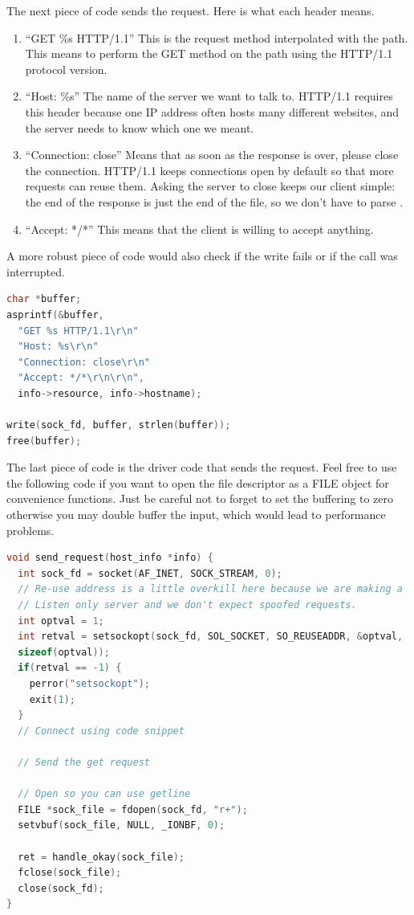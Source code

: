 The next piece of code sends the request. Here is what each header means.

\begin{enumerate}
  \item ``GET \%s HTTP/1.1'' This is the request method interpolated with the path. This means to perform the GET method on the path using the HTTP/1.1 protocol version.
  \item ``Host: \%s'' The name of the server we want to talk to.
    HTTP/1.1 requires this header because one IP address often hosts many different websites, and the server needs to know which one we meant.
  \item ``Connection: close'' Means that as soon as the response is over, please close the connection.
    HTTP/1.1 keeps connections open by default so that more requests can reuse them.
    Asking the server to close keeps our client simple: the end of the response is just the end of the file, so we don't have to parse .
  \item ``Accept: */*'' This means that the client is willing to accept anything.
\end{enumerate}

A more robust piece of code would also check if the write fails or if the call was interrupted.

\begin{lstlisting}[language=C]
char *buffer;
asprintf(&buffer,
  "GET %s HTTP/1.1\r\n"
  "Host: %s\r\n"
  "Connection: close\r\n"
  "Accept: */*\r\n\r\n",
  info->resource, info->hostname);

write(sock_fd, buffer, strlen(buffer));
free(buffer);
\end{lstlisting}

The last piece of code is the driver code that sends the request.
Feel free to use the following code if you want to open the file descriptor as a FILE object for convenience functions.
Just be careful not to forget to set the buffering to zero otherwise you may double buffer the input, which would lead to performance problems.

\begin{lstlisting}[language=C]
void send_request(host_info *info) {
  int sock_fd = socket(AF_INET, SOCK_STREAM, 0);
  // Re-use address is a little overkill here because we are making a
  // Listen only server and we don't expect spoofed requests.
  int optval = 1;
  int retval = setsockopt(sock_fd, SOL_SOCKET, SO_REUSEADDR, &optval,
  sizeof(optval));
  if(retval == -1) {
    perror("setsockopt");
    exit(1);
  }
  // Connect using code snippet

  // Send the get request

  // Open so you can use getline
  FILE *sock_file = fdopen(sock_fd, "r+");
  setvbuf(sock_file, NULL, _IONBF, 0);

  ret = handle_okay(sock_file);
  fclose(sock_file);
  close(sock_fd);
}
\end{lstlisting}

